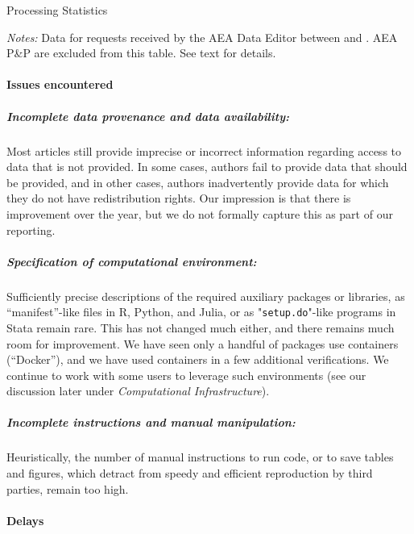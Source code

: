 \begin{table}[]
    \caption{Processing Statistics}
    \label{tab:jirastats}
    \small
    \begin{threeparttable}
    \centering
    
    \begin{tablenotes}
    \item[] \textit{Notes:} Data for requests received by the AEA Data Editor between \firstday{} and \lastday{}. AEA P\&P are excluded from this table. See text for details.
    \end{tablenotes}
 \end{threeparttable}
   \end{table}





\paragraph{Issues encountered}


\subparagraph{Incomplete data provenance and data availability:} Most articles still provide imprecise or incorrect information regarding access to data that is not provided. In some cases, authors fail to provide data that should be provided, and in other cases, authors inadvertently provide data for which they do not have redistribution rights. Our impression is that there is improvement over the year, but we do not formally capture this as part of our reporting.

\subparagraph{Specification of computational environment:}
Sufficiently precise descriptions of the required auxiliary packages or libraries, as ``manifest''-like files in R, Python, and Julia, or as "\texttt{setup.do}"-like programs in Stata remain rare. This has not changed much either, and there remains much room for improvement. We have seen only a handful of packages use containers (``Docker''), and we have used containers in a few additional verifications. We continue to work with some users to leverage such environments (see our discussion later under \textit{Computational Infrastructure}).

\subparagraph{Incomplete instructions and manual manipulation:} Heuristically, the number of manual instructions to run code, or to save tables and figures, which detract from speedy and efficient reproduction by third parties, remain too high. 


\paragraph{Delays} 

